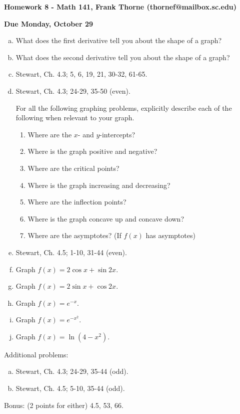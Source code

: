 \documentclass[12pt]{article}
\begin{document}
\setlength{\topmargin}{-2mm}





\begin{center}{\bf Homework 8 - Math 141, Frank Thorne (thornef@mailbox.sc.edu)}
\end{center}
\begin{center}
{\bf Due Monday, October 29}
\end{center}

\begin{enumerate}[(a)]
\item
What does the first derivative tell you about the shape of a graph?

\item
What does the second derivative tell you about the shape of a graph?

\item
Stewart, Ch. 4.3; 5, 6, 19, 21, 30-32, 61-65.

\item
Stewart, Ch. 4.3; 24-29, 35-50 (even).

For all the following graphing problems, explicitly describe each of the following when relevant
to your graph.

\begin{enumerate}[(1)]
\item
Where are the $x$- and $y$-intercepts?

\item
Where is the graph positive and negative?

\item
Where are the critical points?

\item
Where is the graph increasing and decreasing?

\item
Where are the inflection points?

\item
Where is the graph concave up and concave down?

\item
Where are the asymptotes? (If $f(x)$ has asymptotes)
\end{enumerate}
\item
Stewart, Ch. 4.5; 1-10, 31-44 (even).


\item
Graph $f(x) = 2 \cos x + \sin 2x$.

\item
Graph $f(x) = 2 \sin x + \cos 2x$.

\item
Graph $f(x) = e^{-x}$.

\item
Graph $f(x) = e^{-x^2}$.

\item
Graph $f(x) = \ln(4 - x^2)$.
\end{enumerate}
Additional problems:
\begin{enumerate}[(a)]
\item
Stewart, Ch. 4.3; 24-29, 35-44 (odd).
\item

Stewart, Ch. 4.5; 5-10, 35-44 (odd).
\end{enumerate}
Bonus: (2 points for either) 4.5, 53, 66.
\end{document}

